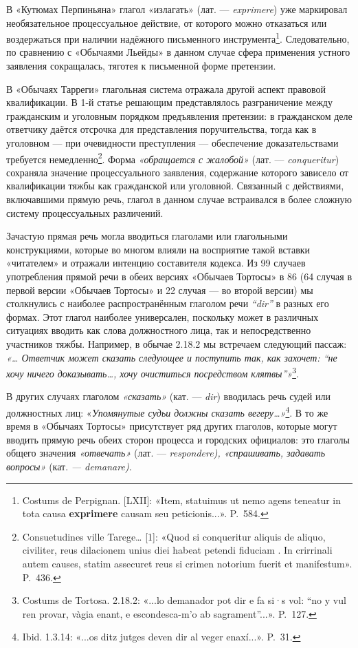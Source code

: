 В «Кутюмах Перпиньяна» глагол «излагать» (лат. --- \emph{exprimere}) уже маркировал необязательное процессуальное действие, от которого можно отказаться или воздержаться при наличии надёжного письменного инструмента\footnote{Costums de Perpignan. [LXII]: «Item, statuimus ut nemo agens teneatur in tota causa \textbf{exprimere} causam seu peticionis...». P.~584.}. Следовательно, по сравнению с «Обычаями Льейды» в данном случае сфера применения устного заявления сокращалась, тяготея к письменной форме претензии.

В «Обычаях Тарреги» глагольная система отражала другой аспект правовой квалификации. В 1-й статье решающим представлялось разграничение между гражданским и уголовным порядком предъявления претензии: в гражданском деле ответчику даётся отсрочка для представления поручительства, тогда как в уголовном --- при очевидности преступления --- обеспечение доказательствами требуется немедленно\footnote{Consuetudines ville Tarege… [1]: «Quod si conqueritur aliquis de aliquo, civiliter, reus dilacionem unius diei habeat petendi fiduciam . In crirrinali autem causes, statim assecuret reus si crimen notorium fuerit et manifestum». P.~436.}. Форма\emph{ «обращается с жалобой»} (лат. --- \emph{conqueritur}) сохраняла значение процессуального заявления, содержание которого зависело от квалификации тяжбы как гражданской или уголовной. Связанный с действиями, включавшими прямую речь, глагол в данном случае встраивался в более сложную систему процессуальных различений.

Зачастую прямая речь могла вводиться глаголами или глагольными конструкциями, которые во многом влияли на восприятие такой вставки «читателем» и отражали интенцию составителя кодекса. Из 99 случаев употребления прямой речи в обеих версиях «Обычаев Тортосы» в 86 (64 случая в первой версии «Обычаев Тортосы» и 22 случая --- во второй версии) мы столкнулись с наиболее распространённым глаголом речи \emph{“dir”} в разных его формах. Этот глагол наиболее универсален, поскольку может в различных ситуациях вводить как слова должностного лица, так и непосредственно участников тяжбы. Например, в обычае 2.18.2 мы встречаем следующий пассаж: \emph{«… Ответчик может сказать следующее и поступить так, как захочет: “не хочу ничего доказывать…, хочу очиститься посредством клятвы”»}\footnote{Costums de Tortosa. 2.18.2: «...lo demanador pot dir e fa si·s vol: “no y vul ren provar, vàgia enant, e escondesca-m'o ab sagrament”...». P.~127.}.

В других случаях глаголом \emph{«}\emph{сказать}\emph{»} (кат. --- \emph{dir}) вводилась речь судей или должностных лиц: «\emph{Упомянутые судьи должны сказать вегеру…»}\footnote{Ibid. 1.3.14: «...os ditz jutges deven dir al veger enaxí...». P.~31.}. В то же время в «Обычаях Тортосы» присутствует ряд других глаголов, которые могут вводить прямую речь обеих сторон процесса и городских официалов: это глаголы общего значения\emph{ }\emph{«отвечать» }(лат. ---\emph{ respondere), «спрашивать, задавать вопросы»} (кат. \emph{--- demanare)}\emph{.}

